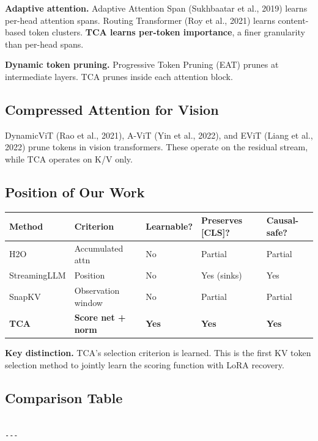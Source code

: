 \textbf{Adaptive attention.} Adaptive Attention Span (Sukhbaatar et al., 2019) 
learns per-head attention spans. Routing Transformer (Roy et al., 2021) 
learns content-based token clusters. \textbf{TCA learns per-token importance}, 
a finer granularity than per-head spans.

\textbf{Dynamic token pruning.} Progressive Token Pruning (EAT) prunes at 
intermediate layers. TCA prunes inside each attention block.

\subsection{Compressed Attention for Vision}

DynamicViT (Rao et al., 2021), A-ViT (Yin et al., 2022), and EViT (Liang 
et al., 2022) prune tokens in vision transformers. These operate on the 
residual stream, while TCA operates on K/V only.

\subsection{Position of Our Work}

\begin{table}[H]
\centering
\small
\begin{tabular}{lllll}
\toprule
\textbf{Method} & \textbf{Criterion} & \textbf{Learnable?} & \textbf{Preserves [CLS]?} & \textbf{Causal-safe?} \\
\midrule
H2O & Accumulated attn & No & Partial & Partial \\
StreamingLLM & Position & No & Yes (sinks) & Yes \\
SnapKV & Observation window & No & Partial & Partial \\
\textbf{TCA} & \textbf{Score net + norm} & \textbf{Yes} & \textbf{Yes} & \textbf{Yes} \\
\bottomrule
\end{tabular}
\end{table}

\textbf{Key distinction.} TCA's selection criterion is learned. This is the first 
KV token selection method to jointly learn the scoring function with LoRA 
recovery.



\subsection{Comparison Table}

\begin{lstlisting}

---
\end{lstlisting}

